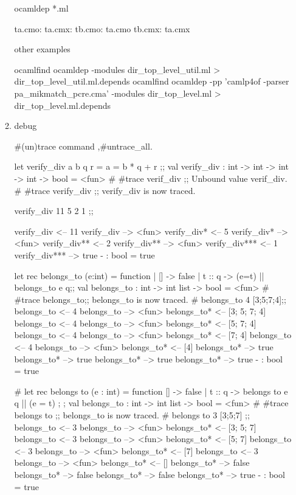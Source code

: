 \begin{enumerate}
\begin{enumerate}
  \begin{redcode}
ocamldep *.ml    
\end{redcode}


\begin{bluecode}
ta.cmo:
ta.cmx:
tb.cmo: ta.cmo
tb.cmx: ta.cmx
\end{bluecode}

other examples

\begin{bluetext}
ocamlfind ocamldep -modules dir_top_level_util.ml > dir_top_level_util.ml.depends
ocamlfind ocamldep -pp 'camlp4of -parser pa_mikmatch_pcre.cma' -modules dir_top_level.ml > dir_top_level.ml.depends
\end{bluetext}

\item debug

  \#(un)trace command ,\#untrace\_all.
  \begin{alternate}
let verify_div a b q r = a = b * q + r ;;
val verify_div : int -> int -> int -> int -> bool = <fun>
# #trace verif_div ;;
Unbound value verif_div.
# #trace verify_div ;;
verify_div is now traced.
\end{alternate}

\begin{redcode}
verify_div 11 5 2 1 ;;  
\end{redcode}


\begin{bluecode}
verify_div <-- 11
verify_div --> <fun>
verify_div* <-- 5
verify_div* --> <fun>
verify_div** <-- 2
verify_div** --> <fun>
verify_div*** <-- 1
verify_div*** --> true
- : bool = true  
\end{bluecode}

\begin{bluetext}
let rec belongs_to (e:int) = function 
    | [] -> false 
    | t :: q -> (e=t) || belongs_to e q;;
    val belongs_to : int -> int list -> bool = <fun>
# #trace belongs_to;;
belongs_to is now traced.
# belongs_to 4 [3;5;7;4];;
belongs_to <-- 4
belongs_to --> <fun>
belongs_to* <-- [3; 5; 7; 4]
belongs_to <-- 4
belongs_to --> <fun>
belongs_to* <-- [5; 7; 4]
belongs_to <-- 4
belongs_to --> <fun>
belongs_to* <-- [7; 4]
belongs_to <-- 4
belongs_to --> <fun>
belongs_to* <-- [4]
belongs_to* --> true
belongs_to* --> true
belongs_to* --> true
belongs_to* --> true
- : bool = true
\end{bluetext}

\begin{bluetext}
# let rec belongs to (e : int) = function
[] -> false
| t :: q -> belongs to e q || (e = t) ; ;
val belongs_to : int -> int list -> bool = <fun> # #trace belongs to ;;
belongs_to is now traced.
# belongs to 3 [3;5;7] ;;
belongs_to <-- 3
belongs_to --> <fun>
belongs_to* <-- [3; 5; 7]
belongs_to <-- 3
belongs_to --> <fun>
belongs_to* <-- [5; 7]
belongs_to <-- 3
belongs_to --> <fun>
belongs_to* <-- [7]
belongs_to <-- 3
belongs_to --> <fun>
belongs_to* <-- []
belongs_to* --> false
belongs_to* --> false
belongs_to* --> false
belongs_to* --> true
- : bool = true  
\end{bluetext}



\end{enumerate}
\end{enumerate}

